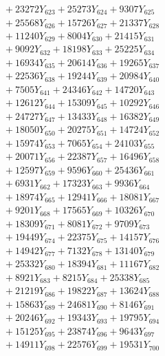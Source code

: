 \documentclass[a4paper,10pt]{article}
\begin{document}
{\begin{align}
&\;  + 23272 Y_{623} + 25273 Y_{624} + 9307 Y_{625} \\[0.3ex]
&\;  + 25568 Y_{626} + 15726 Y_{627} + 21337 Y_{628} \\[0.5ex]\allowbreak
&\;  + 11240 Y_{629} + 8004 Y_{630} + 21415 Y_{631} \\[0.3ex]
&\;  + 9092 Y_{632} + 18198 Y_{633} + 25225 Y_{634} \\[0.3ex]
&\;  + 16934 Y_{635} + 20614 Y_{636} + 19265 Y_{637} \\[0.3ex]
&\;  + 22536 Y_{638} + 19244 Y_{639} + 20984 Y_{640} \\[0.3ex]
&\;  + 7505 Y_{641} + 24346 Y_{642} + 14720 Y_{643} \\[0.3ex]
&\;  + 12612 Y_{644} + 15309 Y_{645} + 10292 Y_{646} \\[0.3ex]
&\;  + 24727 Y_{647} + 13433 Y_{648} + 16382 Y_{649} \\[0.3ex]
&\;  + 18050 Y_{650} + 20275 Y_{651} + 14724 Y_{652} \\[0.3ex]
&\;  + 15974 Y_{653} + 7065 Y_{654} + 24103 Y_{655} \\[0.3ex]
&\;  + 20071 Y_{656} + 22387 Y_{657} + 16496 Y_{658} \\[0.5ex]\allowbreak
&\;  + 12597 Y_{659} + 9596 Y_{660} + 25436 Y_{661} \\[0.3ex]
&\;  + 6931 Y_{662} + 17323 Y_{663} + 9936 Y_{664} \\[0.3ex]
&\;  + 18974 Y_{665} + 12941 Y_{666} + 18081 Y_{667} \\[0.3ex]
&\;  + 9201 Y_{668} + 17565 Y_{669} + 10326 Y_{670} \\[0.3ex]
&\;  + 18309 Y_{671} + 8081 Y_{672} + 9709 Y_{673} \\[0.3ex]
&\;  + 19449 Y_{674} + 22375 Y_{675} + 14157 Y_{676} \\[0.3ex]
&\;  + 14942 Y_{677} + 7132 Y_{678} + 13140 Y_{679} \\[0.3ex]
&\;  + 25332 Y_{680} + 18394 Y_{681} + 11167 Y_{682} \\[0.3ex]
&\;  + 8921 Y_{683} + 8215 Y_{684} + 25338 Y_{685} \\[0.3ex]
&\;  + 21219 Y_{686} + 19822 Y_{687} + 13624 Y_{688} \\[0.5ex]\allowbreak
&\;  + 15863 Y_{689} + 24681 Y_{690} + 8146 Y_{691} \\[0.3ex]
&\;  + 20246 Y_{692} + 19343 Y_{693} + 19795 Y_{694} \\[0.3ex]
&\;  + 15125 Y_{695} + 23874 Y_{696} + 9643 Y_{697} \\[0.3ex]
&\;  + 14911 Y_{698} + 22576 Y_{699} + 19531 Y_{700} \\[0.3ex]

\end{align}}
\end{document}
